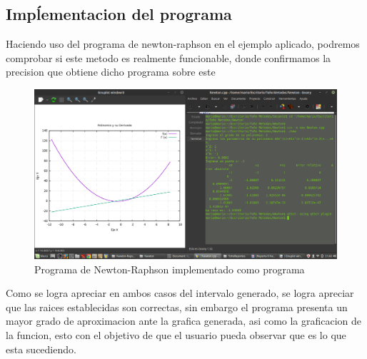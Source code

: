 \documentclass{article}
\begin{document}
\begin{multicols}{2}
\section{Impĺementacion del programa}
\label{sec:Imp}
Haciendo uso del programa de newton-raphson en el ejemplo aplicado, podremos comprobar si este metodo es realmente funcionable, donde confirmamos la precision que obtiene dicho programa sobre este
\begin{figure}[H]
\centering
\includegraphics[scale=.125]{Newton-Raphson.png}
\caption{Programa de Newton-Raphson implementado como programa}
\end{figure} 
Como se logra apreciar en ambos casos del intervalo generado, se logra apreciar que las raices establecidas son correctas, sin embargo el programa presenta un mayor grado de aproximacion ante la grafica generada, asi como la graficacion de la funcion, esto con el objetivo de que el usuario pueda observar que es lo que esta sucediendo.


\end{multicols}
\end{document}
